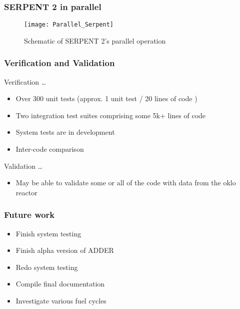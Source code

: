 \documentclass{beamer}
\begin{document}
\begin{frame}
\frametitle{SERPENT 2 in parallel}

    \begin{figure}
        \centering
        \texttt{[image: Parallel\_Serpent]}
        \caption{Schematic of SERPENT 2's parallel operation}
        \label{fig:parallel_serpent}
    \end{figure}

\end{frame}

\begin{frame}
\frametitle{Verification and Validation}

    Verification \ldots

    \hspace{1cm}

    \begin{itemize}
        \item Over 300 unit tests (approx. 1 unit test / 20 lines of code )
        \item Two integration test suites comprising some 5k+ lines of code
        \item System tests are in development
        \item Inter-code comparison
    \end{itemize}

    \hspace{2cm}

    Validation \ldots

    \hspace{1cm}

    \begin{itemize}
        \item May be able to validate some or all of the code with data from
            the oklo reactor
    \end{itemize}

\end{frame}

\begin{frame}
\frametitle{Future work}

    \begin{itemize}

        \item Finish system testing
        \item Finish alpha version of ADDER
        \item Redo system testing
        \item Compile final documentation
        \item Investigate various fuel cycles

    \end{itemize}

\end{frame}
\end{document}
